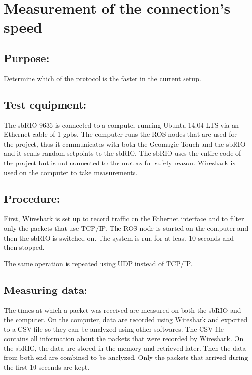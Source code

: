 \section*{Measurement of the connection's speed} %

\subsection*{Purpose:}

Determine which of the protocol is the faster in the current setup.

\subsection*{Test equipment:}

The sbRIO 9636 is connected to a computer running Ubuntu 14.04 LTS via an Ethernet cable of 1 gpbs. The computer runs the ROS nodes that are used for the project, thus it communicates with both the Geomagic Touch and the sbRIO and it sends random setpoints to the sbRIO. The sbRIO uses the entire code of the project but is not connected to the motors for safety reason. 
Wireshark is used on the computer to take measurements.%

\subsection*{Procedure:}

First, Wireshark is set up to record traffic on the Ethernet interface and to filter only the packets that use TCP/IP. The ROS node is started on the computer and then the sbRIO is switched on. The system is run for at least 10 seconds and then stopped.

The same operation is repeated using UDP instead of TCP/IP.

\subsection*{Measuring data:}

The times at which a packet was received are measured on both the sbRIO and the computer.
On the computer, data are recorded using Wireshark and exported to a CSV file so they can be analyzed using other softwares. The CSV file contains all information about the packets that were recorded by Wireshark.
On the sbRIO, the data are stored in the memory and retrieved later.
Then the data from both end are combined to be analyzed.
Only the packets that arrived during the first 10 seconds are kept.

